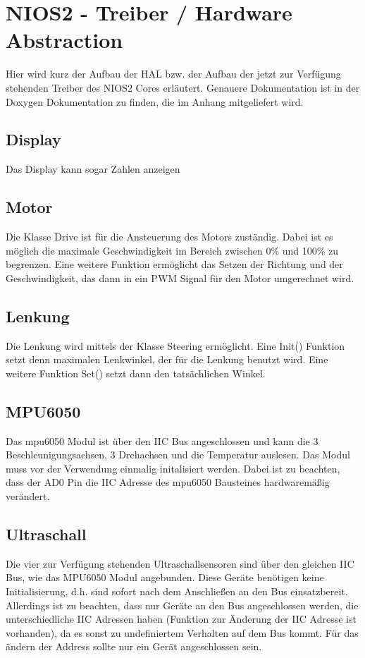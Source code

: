 \chapter{NIOS2 - Treiber / Hardware Abstraction}
Hier wird kurz der Aufbau der HAL bzw. der Aufbau der jetzt zur Verfügung stehenden Treiber des NIOS2 Cores erläutert. Genauere Dokumentation ist in der Doxygen Dokumentation zu finden, die im Anhang mitgeliefert wird. 
\section{Display}
Das Display kann sogar Zahlen anzeigen
\section{Motor}
Die Klasse Drive ist für die Ansteuerung des Motors zuständig. Dabei ist es möglich die maximale Geschwindigkeit im Bereich zwischen 0\% und 100\% zu begrenzen. Eine weitere Funktion ermöglicht das Setzen der Richtung und der Geschwindigkeit, das dann in ein PWM Signal für den Motor umgerechnet wird. 
\section{Lenkung}
Die Lenkung wird mittels der Klasse Steering ermöglicht. Eine Init() Funktion setzt denn maximalen Lenkwinkel, der für die Lenkung benutzt wird. Eine weitere Funktion Set() setzt dann den tatsächlichen Winkel.
\section{MPU6050}
Das mpu6050 Modul ist über den IIC Bus angeschlossen und kann die 3 Beschleunigungsachsen, 3 Drehachsen und die Temperatur auslesen. Das Modul muss vor der Verwendung einmalig initalisiert werden. Dabei ist zu beachten, dass der AD0 Pin die IIC Adresse des mpu6050 Bausteines hardwaremäßig verändert. 
\section{Ultraschall}
Die vier zur Verfügung stehenden Ultraschallsensoren sind über den gleichen IIC Bus, wie das MPU6050 Modul angebunden. Diese Geräte benötigen keine Initialisierung, d.h. sind sofort nach dem Anschließen an den Bus einsatzbereit. Allerdings ist zu beachten, dass nur Geräte an den Bus angeschlossen werden, die unterschiedliche IIC Adressen haben (Funktion zur Änderung der IIC Adresse ist vorhanden), da es sonst zu undefiniertem Verhalten auf dem Bus kommt. Für das ändern der Address sollte nur ein Gerät angeschlossen sein.

